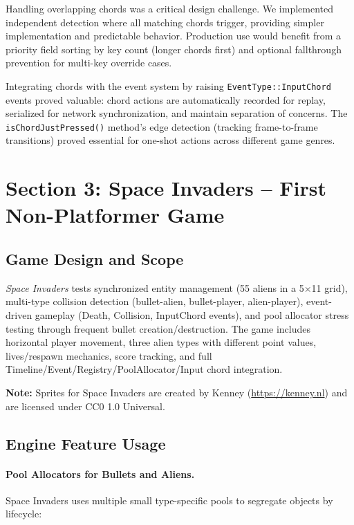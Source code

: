 \documentclass[12pt]{article}
\begin{document}
Handling overlapping chords was a critical design challenge. We implemented independent detection where all matching chords trigger, providing simpler implementation and predictable behavior. Production use would benefit from a priority field sorting by key count (longer chords first) and optional fallthrough prevention for multi-key override cases.

Integrating chords with the event system by raising \texttt{EventType::InputChord} events proved valuable: chord actions are automatically recorded for replay, serialized for network synchronization, and maintain separation of concerns. The \texttt{isChordJustPressed()} method's edge detection (tracking frame-to-frame transitions) proved essential for one-shot actions across different game genres.

\section{Section 3: Space Invaders – First Non-Platformer Game}

\subsection{Game Design and Scope}

\emph{Space Invaders} tests synchronized entity management (55 aliens in a 5×11 grid), multi-type collision detection (bullet-alien, bullet-player, alien-player), event-driven gameplay (Death, Collision, InputChord events), and pool allocator stress testing through frequent bullet creation/destruction. The game includes horizontal player movement, three alien types with different point values, lives/respawn mechanics, score tracking, and full Timeline/Event/Registry/PoolAllocator/Input chord integration.

\textbf{Note:} Sprites for Space Invaders are created by Kenney (\url{https://kenney.nl}) and are licensed under CC0 1.0 Universal.

\subsection{Engine Feature Usage}

\paragraph{Pool Allocators for Bullets and Aliens.}
Space Invaders uses multiple small type-specific pools to segregate objects by lifecycle:
\end{document}
